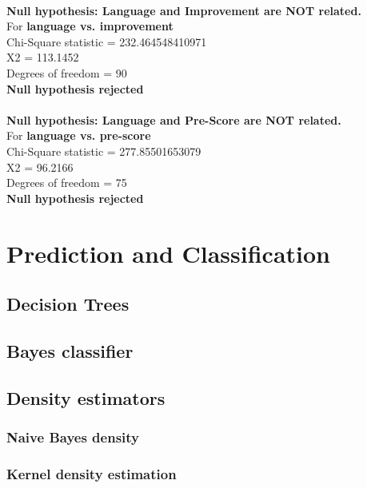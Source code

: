 \documentclass[10pt]{article}
\begin{document}
\\
\textbf{Null hypothesis: Language and Improvement are NOT related.}\\
 For \textbf{language vs. improvement}\\
 Chi-Square statistic = 232.464548410971\\
 X2 = 113.1452\\
 Degrees of freedom = 90\\
 \textbf{Null hypothesis rejected}\\
\\
\textbf{Null hypothesis: Language and Pre-Score are NOT related.}\\
 For \textbf{language vs. pre-score}\\
 Chi-Square statistic = 277.85501653079\\
 X2 = 96.2166\\
 Degrees of freedom = 75\\
 \textbf{Null hypothesis rejected}\\

\newpage
\section{Prediction and Classification}
\newpage
\subsection{Decision Trees}
\newpage
\subsection{Bayes classifier}
\newpage
\subsection{Density estimators}
\subsubsection{Naive Bayes density}
\subsubsection{Kernel density estimation}
\end{document}
